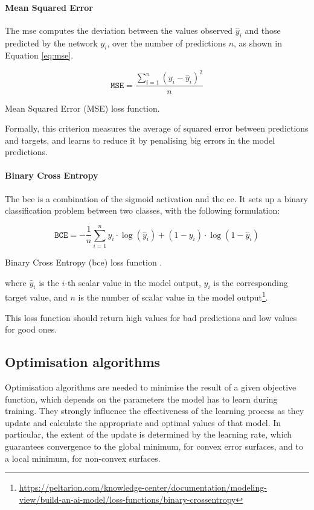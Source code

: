 \paragraph*{Mean Squared Error} 
The \gls{mse} computes the deviation between the values observed $\hat y_i$ and 
those predicted by the network $y_i$, over the number of predictions $n$, as 
shown in Equation \ref{eq:mse}.
\begin{Equation}[!htb]
	\centering
	\begin{equation}
	\mathtt{MSE} = \frac{\sum_{i=1}^n (y_i-\hat y_i)^2}{n}
	\end{equation}
	\caption{Mean Squared Error (MSE) loss function.}
	\label{eq:mse}
\end{Equation}
Formally, this criterion measures the average of squared error between 
predictions and targets, and learns to reduce it by penalising big errors in the 
model predictions.

\paragraph*{Binary Cross Entropy} 
The \gls{bce} is a combination of the sigmoid activation and the \gls{ce}. It sets up 
a binary classification problem between two classes, with the following 
formulation:

\begin{Equation}[!htb]
	\centering
	\begin{equation}
	\mathtt{BCE} = -\frac{1}{n} \sum_{i=1}^n y_i \cdot \log(\hat y_i) + (1-y_i) 
	\cdot \log(1 - \hat y_i)
	\end{equation}
	\caption[Binary Cross Entropy (BCE) loss function.\bigskip]{Binary Cross 
		Entropy 
		(\gls{bce}) loss function \cite[][]{sadowski2016notes}.}
	\label{eq:bce}
\end{Equation}

\noindent
where $\hat y_i$ is the $i$-th scalar value in the model output, $y_i$ is the 
corresponding target value, and $n$ is the number of scalar value in the model 
output\footnote{\url{https://peltarion.com/knowledge-center/documentation/modeling-view/build-an-ai-model/loss-functions/binary-crossentropy}}.

This loss function should return high values for bad predictions and low values for 
good ones.

\subsection{Optimisation algorithms}
\label{subsec:optimiser}
Optimisation algorithms are needed to minimise the result of a given objective 
function, which depends on the parameters the model has to learn during 
training.
They strongly influence the effectiveness of the learning process as they update 
and calculate the appropriate and optimal values of that model. 
In particular, the extent of the update is determined by the learning rate, which 
guarantees convergence to the global minimum, for convex error surfaces, and to 
a local minimum, for non-convex surfaces.

